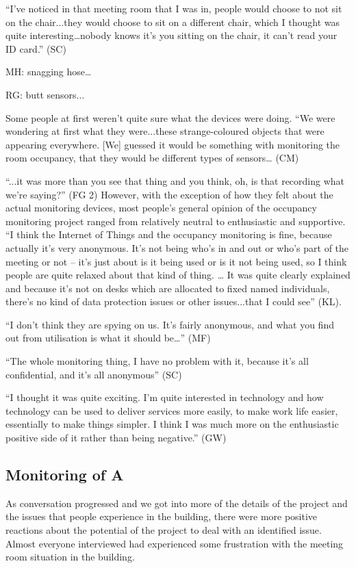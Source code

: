 “I’ve noticed in that meeting room that I was in, people would choose
to not sit on the chair...they would choose to sit on a different
chair, which I thought was quite interesting…nobody knows it’s you
sitting on the chair, it can’t read your ID card.” (SC)

MH: snagging hose…

RG: butt sensors...

Some people at first weren’t quite sure what the devices were doing.
“We were wondering at first what they were...these strange-coloured
objects that were appearing everywhere. [We] guessed it would be
something with monitoring the room occupancy, that they would be
different types of sensors… (CM)

“...it was more than you see that thing and you think, oh, is that recording what we’re saying?” (FG 2)
However, with the exception of how they felt about the actual monitoring devices, most people’s general opinion of the occupancy monitoring project ranged from relatively neutral to enthusiastic and supportive.
“I think the Internet of Things and the occupancy monitoring is fine,
because actually it’s very anonymous. It’s not being who’s in and out
or who’s part of the meeting or not – it’s just about is it being used
or is it not being used, so I think people are quite relaxed about
that kind of thing. … It was quite clearly explained and because it’s
not on desks which are allocated to fixed named individuals, there’s
no kind of data protection issues or other issues...that I could see”
(KL).

“I don’t think they are spying on us. It’s fairly anonymous, and what
you find out from utilisation is what it should be…” (MF)

“The whole monitoring thing, I have no problem with it, because it’s
all confidential, and it’s all anonymous” (SC)

“I thought it was quite exciting. I’m quite interested in technology
and how technology can be used to deliver services more easily, to
make work life easier, essentially to make things simpler. I think I
was much more on the enthusiastic positive side of it rather than
being negative.” (GW)

\subsection{Monitoring of A}

As conversation progressed and we got into more of the details of the
project and the issues that people experience in the building, there
were more positive reactions about the potential of the project to
deal with an identified issue. Almost everyone interviewed had
experienced some frustration with the meeting room situation in the
building.

